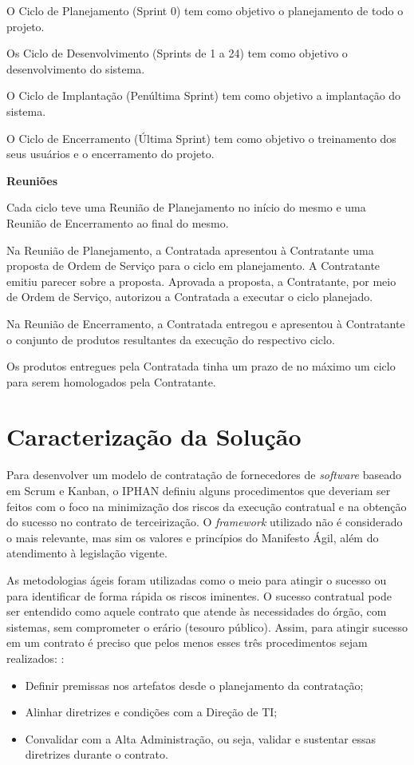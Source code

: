 O Ciclo de Planejamento (Sprint 0) tem como objetivo o planejamento de todo o projeto.

Os Ciclo de Desenvolvimento (Sprints de 1 a 24) tem como objetivo o desenvolvimento do sistema.

O Ciclo de Implantação (Penúltima Sprint) tem como objetivo a implantação do sistema.

O Ciclo de Encerramento (Última Sprint) tem como objetivo o treinamento dos seus usuários e o encerramento do projeto.

\textbf{Reuniões}

Cada ciclo teve uma Reunião de Planejamento no início do mesmo e uma Reunião de Encerramento ao final do mesmo.

Na Reunião de Planejamento, a Contratada apresentou à Contratante uma proposta de Ordem de Serviço para o ciclo em planejamento. A Contratante emitiu parecer sobre a proposta. Aprovada a proposta, a Contratante, por meio de Ordem de Serviço, autorizou a Contratada a executar o ciclo planejado.

Na Reunião de Encerramento, a Contratada entregou e apresentou à Contratante o conjunto de produtos resultantes da execução do respectivo ciclo.

Os produtos entregues pela Contratada tinha um prazo de no máximo um ciclo para serem homologados pela Contratante.

\section[Caracterização da Solução]{Caracterização da Solução}

Para desenvolver um modelo de contratação de fornecedores de \textit{software} baseado em Scrum e Kanban, o IPHAN definiu alguns procedimentos que deveriam ser feitos com o foco na minimização dos riscos da execução contratual e na obtenção do sucesso no contrato de terceirização. O \textit{framework} utilizado não é considerado o mais relevante, mas sim os valores e princípios do Manifesto Ágil, além do atendimento à legislação vigente. 

As metodologias ágeis foram utilizadas como o meio para atingir o sucesso ou para identificar de forma rápida os riscos iminentes. O sucesso contratual pode ser entendido como aquele contrato que atende às necessidades do órgão, com sistemas, sem comprometer o erário (tesouro público). Assim, para atingir sucesso em um contrato é preciso que pelos menos esses três procedimentos sejam realizados: \cite{parente}:
\begin{itemize}
\item Definir premissas nos artefatos desde o planejamento da contratação;
\item Alinhar diretrizes e condições com a Direção de TI;
\item Convalidar com a Alta Administração, ou seja, validar e sustentar essas diretrizes durante o contrato.
\end{itemize}

